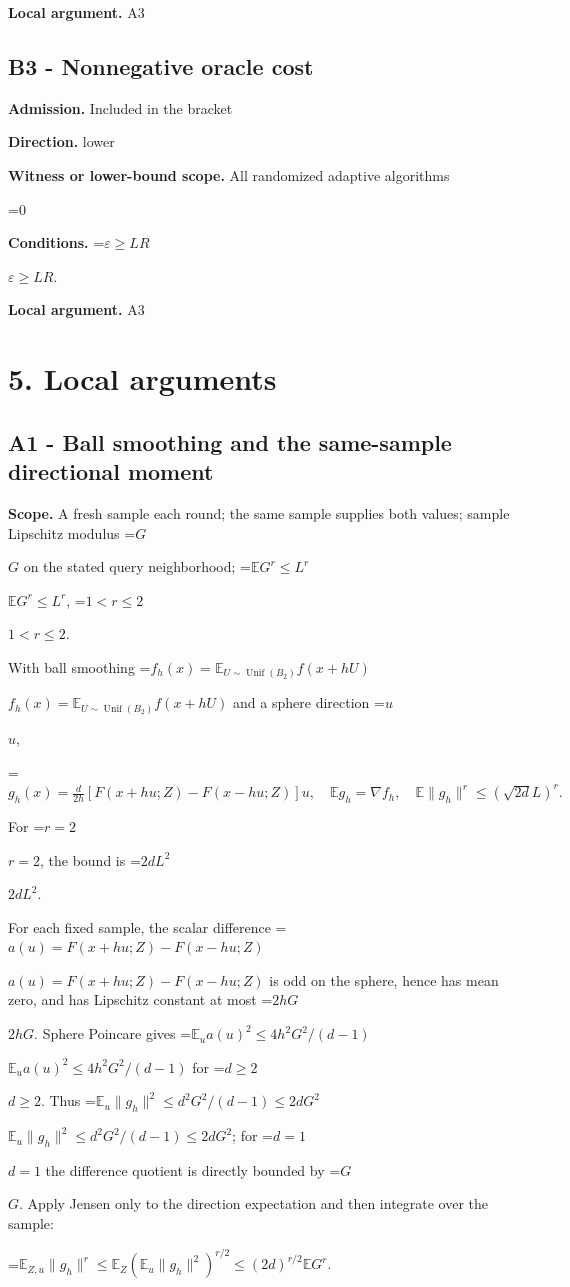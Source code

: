 \documentclass[10pt,a4paper]{article}
\newcommand{\AtlasMath}[1]{\par\begingroup\centering\setbox0=\hbox{$\displaystyle #1$}\ifdim\wd0>1.4\linewidth\typeout{ATLAS WIDE FORMULA: \the\wd0}\fi\ifdim\wd0>\linewidth\resizebox{\linewidth}{!}{\box0}\else\box0\fi\par\endgroup}
\newcommand{\AtlasInlineMath}[1]{\begingroup\setbox0=\hbox{$#1$}\ifdim\wd0>.4\linewidth\endgroup\AtlasMath{#1}\else\endgroup$#1$\fi}
\begin{document}
\textbf{Local argument.} A3

\subsection{B3 - Nonnegative oracle cost}
\textbf{Admission.} Included in the bracket

\textbf{Direction.} lower

\textbf{Witness or lower-bound scope.} All randomized adaptive algorithms

\AtlasMath{0}
\textbf{Conditions.} \AtlasInlineMath{\varepsilon\ge LR}.

\textbf{Local argument.} A3

\section{5. Local arguments}
\subsection{A1 - Ball smoothing and the same-sample directional moment}
\textbf{Scope.} A fresh sample each round; the same sample supplies both values; sample Lipschitz modulus \AtlasInlineMath{G} on the stated query neighborhood; \AtlasInlineMath{\mathbb E G^r\le L^r}, \AtlasInlineMath{1<r\le2}.

With ball smoothing \AtlasInlineMath{f_h(x)=\mathbb E_{U\sim\operatorname{Unif}(B_2)}f(x+hU)} and a sphere direction \AtlasInlineMath{u},

\AtlasMath{g_h(x)=\frac d{2h}[F(x+hu;Z)-F(x-hu;Z)]u,\quad\mathbb E g_h=\nabla f_h,\quad\mathbb E\|g_h\|^r\le(\sqrt{2d}L)^r.}

For \AtlasInlineMath{r=2}, the bound is \AtlasInlineMath{2dL^2}.

For each fixed sample, the scalar difference \AtlasInlineMath{a(u)=F(x+hu;Z)-F(x-hu;Z)} is odd on the sphere, hence has mean zero, and has Lipschitz constant at most \AtlasInlineMath{2hG}. Sphere Poincare gives \AtlasInlineMath{\mathbb E_u a(u)^2\le4h^2G^2/(d-1)} for \AtlasInlineMath{d\ge2}. Thus \AtlasInlineMath{\mathbb E_u\|g_h\|^2\le d^2G^2/(d-1)\le2dG^2}; for \AtlasInlineMath{d=1} the difference quotient is directly bounded by \AtlasInlineMath{G}. Apply Jensen only to the direction expectation and then integrate over the sample:

\AtlasMath{\mathbb E_{Z,u}\|g_h\|^r\le\mathbb E_Z(\mathbb E_u\|g_h\|^2)^{r/2}\le(2d)^{r/2}\mathbb E G^r.}
\end{document}
